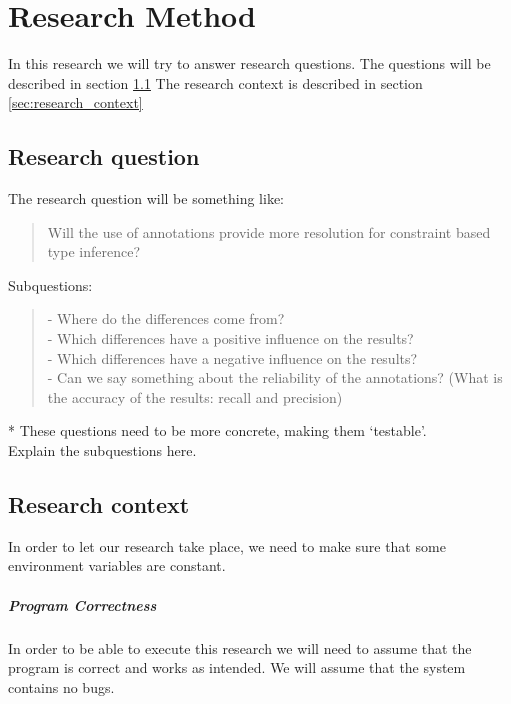 \documentclass[../main.tex]{subfiles}
\begin{document}
    \chapter{Research Method}\label{chap:research_method}

    In this research we will try to answer research questions.
    The questions will be described in section \ref{sec:research_question}
    The research context is described in section \ref{sec:research_context}

    \section{Research question}\label{sec:research_question}
    The research question will be something like: \\
    \begin{quote}
        Will the use of annotations\footnotemark{} provide more resolution for constraint based type inference?
    \end{quote}
    Subquestions:
    \begin{quote}
        - Where do the differences come from?
        \\
        - Which differences have a positive influence on the results?
        \\
        - Which differences have a negative influence on the results?
        \\
        - Can we say something about the reliability of the annotations? (What is the accuracy of the results: recall and precision)
    \end{quote}
    * These questions need to be more concrete, making them `testable'.
    \\
    Explain the subquestions here.
    
    \section{Research context} \cite{sec:research_context}
    In order to let our research take place, we need to make sure that some environment variables are constant.
    
    \paragraph{Program Correctness}
    In order to be able to execute this research we will need to assume that the program is correct and works as intended. We will assume that the system contains no bugs.
    
\end{document}
